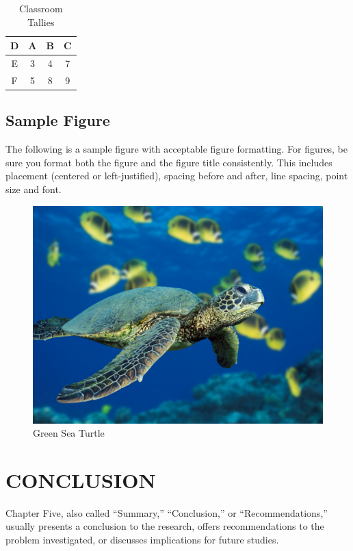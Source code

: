 \documentclass{UCF_ETD}
\begin{document}

\begin{table}[h]
\centering
\caption{Classroom Tallies}
\begin{tabular}{ |c|c|c|c|}
\hline
D & A & B & C\\
\hline
E &  3  & 4 & 7\\
\hline
F  &  5   & 8 & 9\\
\hline
\end{tabular}
\end{table}

\section{Sample Figure}
The following is a sample figure with acceptable figure formatting. For figures, be sure you format both the figure and the figure title consistently. This includes placement (centered or left-justified), spacing before and after, line spacing, point size and font.

\begin{figure}
\begin{center}
\includegraphics[scale=0.5]{Picture1}
\caption{Green Sea Turtle}
\end{center}
\end{figure}

\chapter{CONCLUSION}
Chapter Five, also called ``Summary,'' ``Conclusion,'' or ``Recommendations,'' usually presents a conclusion to the research, offers recommendations to the problem investigated, or discusses implications for future studies.
\end{document}
